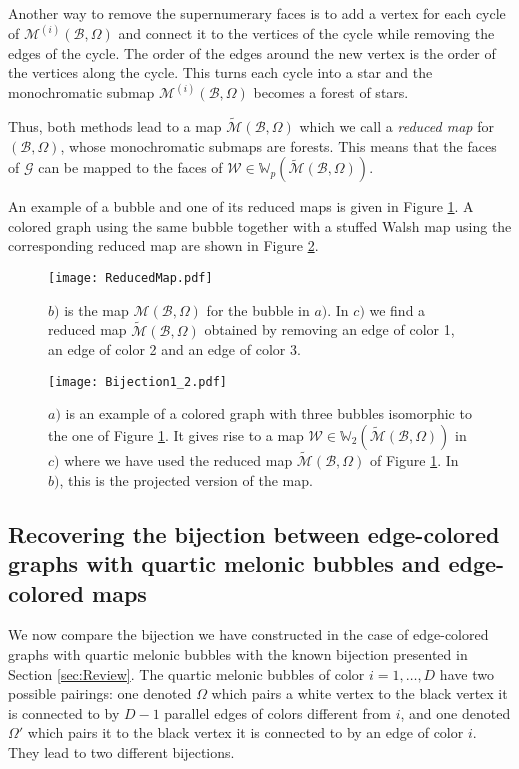 \documentclass[aps,prd,10pt,notitlepage,nofootinbib,superscriptaddress,showkeys,showpacs]{revtex4-1}
\begin{document}
Another way to remove the supernumerary faces is to add a vertex for each cycle of ${\mathcal{M}}^{(i)}({\mathcal{B}}, \Omega)$ and connect it to the vertices of the cycle while removing the edges of the cycle. The order of the edges around the new vertex is the order of the vertices along the cycle. This turns each cycle into a star and the monochromatic submap ${\mathcal{M}}^{(i)}({\mathcal{B}}, \Omega)$ becomes a forest of stars.

Thus, both methods lead to a map $\tilde{\mathcal{M}}({\mathcal{B}}, \Omega)$ which we call a \emph{reduced map} for $({\mathcal{B}}, \Omega)$, whose monochromatic submaps are forests. This means that the faces of ${\mathcal{G}}$ can be mapped to the faces of ${\mathcal{W}}\in{\mathbb{W}}_p(\tilde{\mathcal{M}}({\mathcal{B}}, \Omega))$.

An example of a bubble and one of its reduced maps is given in Figure \ref{fig:FromBtoV}. A colored graph using the same bubble together with a stuffed Walsh map using the corresponding reduced map are shown in Figure \ref{fig:Bijection1_2}.

\begin{figure}
\texttt{[image: ReducedMap.pdf]}
\caption{\label{fig:FromBtoV} $b)$ is the map ${\mathcal{M}}({\mathcal{B}}, \Omega)$ for the bubble in $a)$. In $c)$ we find a reduced map $\tilde{\mathcal{M}}({\mathcal{B}}, \Omega)$ obtained by removing an edge of color 1, an edge of color 2 and an edge of color 3.}
\end{figure}

\begin{figure}
\texttt{[image: Bijection1\_2.pdf]}
\caption{\label{fig:Bijection1_2} $a)$ is an example of a colored graph with three bubbles isomorphic to the one of Figure \ref{fig:FromBtoV}. It gives rise to a map ${\mathcal{W}}\in{\mathbb{W}}_2(\tilde{\mathcal{M}}({\mathcal{B}}, \Omega))$ in $c)$ where we have used the reduced map $\tilde{\mathcal{M}}({\mathcal{B}}, \Omega)$ of Figure \ref{fig:FromBtoV}. In $b)$, this is the projected version of the map.}
\end{figure}

\subsection{Recovering the bijection between edge-colored graphs with quartic melonic bubbles and edge-colored maps}

We now compare the bijection we have constructed in the case of edge-colored graphs with quartic melonic bubbles with the known bijection presented in Section \ref{sec:Review}. The quartic melonic bubbles of color $i=1, \dotsc, D$ have two possible pairings: one denoted $\Omega$ which pairs a white vertex to the black vertex it is connected to by $D-1$ parallel edges of colors different from $i$, and one denoted $\Omega'$ which pairs it to the black vertex it is connected to by an edge of color $i$. They lead to two different bijections.
\end{document}
